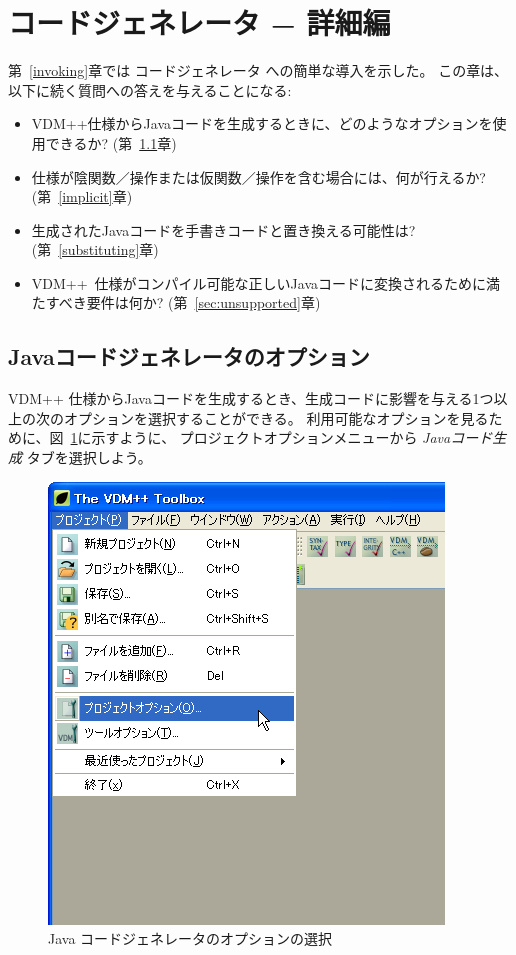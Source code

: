 \documentclass[\pformat,11pt]{jarticle}
\newcommand{\tcg}{コードジェネレータ}
\newcommand{\VDM}{VDM++}
\begin{document}
\newpage
\section{コードジェネレータ − 詳細編}
\label{advancedissues}

第~\ref{invoking}章では \tcg{} への簡単な導入を示した。
この章は、以下に続く質問への答えを与えることになる:

\begin{itemize}
\item VDM++仕様からJavaコードを生成するときに、どのようなオプションを使用できるか? (第~\ref{options}章) 
\item 仕様が陰関数／操作または仮関数／操作を含む場合には、何が行えるか? (第~\ref{implicit}章) 
\item 生成されたJavaコードを手書きコードと置き換える可能性は? (第~\ref{substituting}章) 
\item  \VDM\ 仕様がコンパイル可能な正しいJavaコードに変換されるために満たすべき要件は何か?
(第~\ref{sec:unsupported}章) 
\end{itemize}

\subsection{Javaコードジェネレータのオプション}
\label{options}

VDM++ 仕様からJavaコードを生成するとき、生成コードに影響を与える1つ以上の次のオプションを選択することができる。
利用可能なオプションを見るために、図~\ref{fig:optionsmenu}に示すように、
プロジェクトオプションメニューから \textit{Javaコード生成} タブを選択しよう。

\begin{figure}[H]
\begin{center}
\includegraphics[width=.8\textwidth]{optionsmenu}
\caption{Java コードジェネレータのオプションの選択}\label{fig:optionsmenu}
\end{center}
\end{figure}
\end{document}
